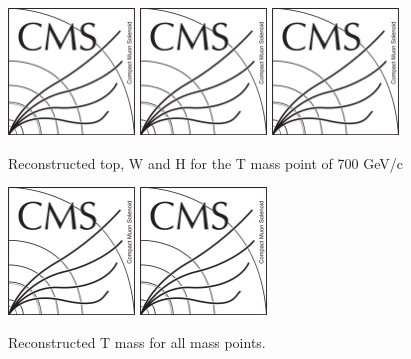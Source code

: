 \begin{figure}[!Hhtbp]
  \begin{center}
    \includegraphics[width=0.3\textwidth]{figs/CMSlogo.png}
    \includegraphics[width=0.3\textwidth]{figs/CMSlogo.png}
    \includegraphics[width=0.3\textwidth]{figs/CMSlogo.png}
    \caption{Reconstructed top, W and H for the T mass point of 700 GeV/c}
    \label{fig:WHt}
  \end{center}
\end{figure}\clearpage

\begin{figure}[!Hhtbp]
  \begin{center}
    \includegraphics[width=0.3\textwidth]{figs/CMSlogo.png}
    \includegraphics[width=0.3\textwidth]{figs/CMSlogo.png}
    \caption{Reconstructed T mass for all mass points.}
    \label{fig:RecT}
  \end{center}
\end{figure}\clearpage

